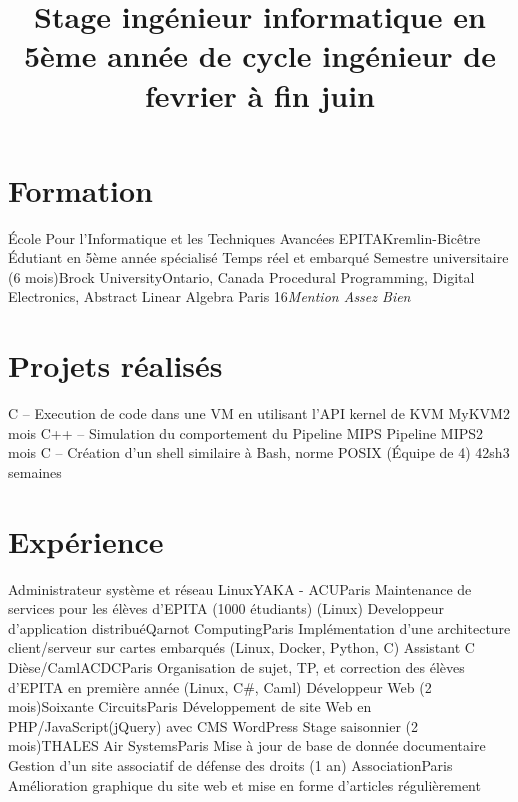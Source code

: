 \documentclass[10pt,a4paper,sans]{moderncv}
\title{Stage ingénieur informatique\newline{}
 en 5ème année de cycle ingénieur\newline{}
 de fevrier à fin juin}
\begin{document}
\makecvtitle

\vspace{-1.5\baselineskip}

\section{Formation}
    {École Pour l'Informatique et les Techniques Avancées}
    {EPITA}{Kremlin-Bicêtre}{}
    {Édutiant en 5ème année spécialisé Temps réel et embarqué}
    {Semestre universitaire (6 mois)}{Brock University}{Ontario, Canada}{}
    {Procedural Programming, Digital Electronics, Abstract Linear Algebra}
    {Paris 16}{\textit{Mention Assez Bien}}{}

\section{Projets réalisés}
    {C -- Execution de code dans une VM en utilisant l'API kernel de KVM}
    {MyKVM}{2 mois}{}{}
    {C++ -- Simulation du comportement du Pipeline MIPS}
    {Pipeline MIPS}{2 mois}{}{}
    {C -- Création d'un shell similaire à Bash, norme POSIX (Équipe de 4)}
    {42sh}{3 semaines}{}{}

\section{Expérience}
    {Administrateur système et réseau Linux}{YAKA - ACU}{Paris}{}
    {Maintenance de services pour les élèves d'EPITA (1000 étudiants) (Linux)}
    {Developpeur d'application distribué}{Qarnot Computing}{Paris}{}
    {Implémentation d'une architecture client/serveur sur cartes embarqués (Linux, Docker, Python, C)}
    {Assistant C Dièse/Caml}{ACDC}{Paris}{}
    {Organisation de sujet, TP, et correction des élèves d'EPITA en première année (Linux, C\#, Caml)}
    {Développeur Web (2 mois)}{Soixante Circuits}{Paris}{}
    {Développement de site Web en PHP/JavaScript(jQuery) avec CMS WordPress}
    {Stage saisonnier (2 mois)}{THALES Air Systems}{Paris}{}
    {Mise à jour de base de donnée documentaire}
    {Gestion d'un site associatif de défense des droits (1 an)}
    {Association}{Paris}{}
    {Amélioration graphique du site web et mise en forme d'articles régulièrement}
\end{document}
